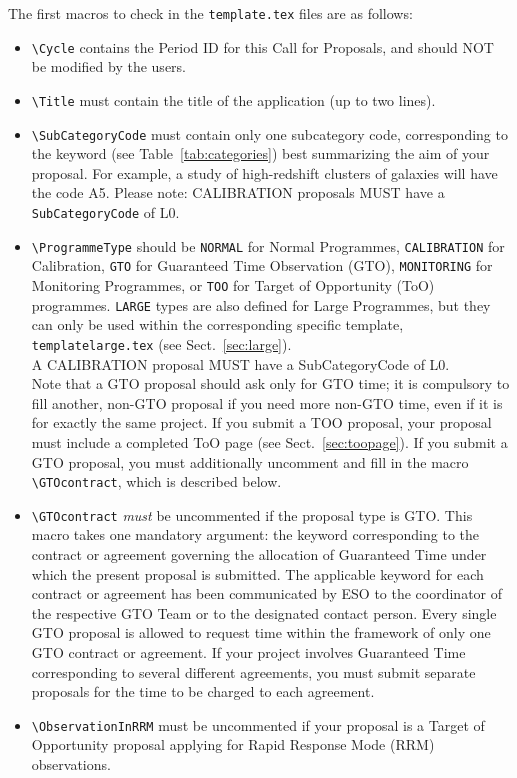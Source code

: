 \documentclass{article}
\begin{document}
The first macros to check in the {\tt template.tex} files are as follows:
\begin{itemize}
\item \verb|\Cycle| contains the Period ID for this Call for
  Proposals, and should NOT be modified by the users.
\item \verb|\Title| must contain the title of the application (up to
  two lines).
\item \verb|\SubCategoryCode| must contain only one subcategory code,
  corresponding to the keyword (see Table~\ref{tab:categories}) best
  summarizing the aim of your proposal. 
  For example, a study of
  high-redshift clusters of galaxies will have the code A5. 
  Please note: CALIBRATION proposals MUST have a \verb|SubCategoryCode| of L0.
\item \verb|\ProgrammeType| should be {\tt NORMAL} for Normal Programmes, 
 {\tt CALIBRATION} for Calibration, {\tt GTO} for Guaranteed Time Observation 
 (GTO), {\tt MONITORING} for Monitoring Programmes, or {\tt TOO} for Target of 
 Opportunity (ToO) programmes.  
 {\tt LARGE} types are also defined for Large Programmes, but they can only be 
 used within the corresponding specific template, {\tt templatelarge.tex} 
 (see Sect.~\ref{sec:large}).\\
  A CALIBRATION proposal MUST have a SubCategoryCode of L0.\\
  Note that a GTO proposal should ask only for GTO time; it is
  compulsory to fill another, non-GTO proposal if you need more non-GTO
  time, even if it is for exactly the same project. If you submit a
  TOO proposal, your proposal must include a completed ToO page
  (see Sect.~\ref{sec:toopage}). If you submit a GTO proposal, you
  must additionally uncomment and fill in the macro
  \verb|\GTOcontract|, which is described below.
\item \verb|\GTOcontract| {\em must\/} be uncommented if the proposal
  type is GTO. This macro takes one mandatory argument: 
  the keyword corresponding to the contract or agreement
  governing the allocation of Guaranteed Time under which the present
  proposal is submitted. The applicable keyword for each contract or
  agreement has been communicated by ESO to the coordinator of the
  respective GTO Team or to the designated contact person. Every
  single GTO proposal is allowed to request time within the framework
  of only one GTO contract or agreement. If your project involves
  Guaranteed Time corresponding to several different agreements, you
  must submit separate proposals for the time to be charged to each
  agreement. 
\item \verb|\ObservationInRRM| must be uncommented if your proposal is
  a Target of Opportunity proposal applying for Rapid Response Mode
  (RRM) observations.
\end{itemize}
\end{document}
